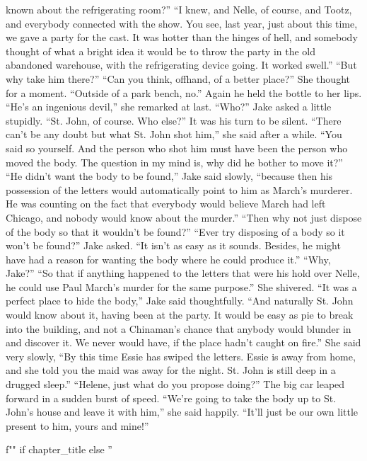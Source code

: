 \documentclass{novel}
\begin{document}
known about the refrigerating room?” “I knew, and Nelle, of course, and Tootz, and everybody connected with the show. You see, last year, just about this time, we gave a party for the cast. It was hotter than the hinges of hell, and somebody thought of what a bright idea it would be to throw the party in the old abandoned warehouse, with the refrigerating device going. It worked swell.” “But why take him there?” “Can you think, offhand, of a better place?” She thought for a moment. “Outside of a park bench, no.” Again he held the bottle to her lips. “He’s an ingenious devil,” she remarked at last. “Who?” Jake asked a little stupidly. “St. John, of course. Who else?” It was his turn to be silent. “There can’t be any doubt but what St. John shot him,” she said after a while. “You said so yourself. And the person who shot him must have been the person who moved the body. The question in my mind is, why did he bother to move it?” “He didn’t want the body to be found,” Jake said slowly, “because then his possession of the letters would automatically point to him as March’s murderer. He was counting on the fact that everybody would believe March had left Chicago, and nobody would know about the murder.” “Then why not just dispose of the body so that it wouldn’t be found?” “Ever try disposing of a body so it won’t be found?” Jake asked. “It isn’t as easy as it sounds. Besides, he might have had a reason for wanting the body where he could produce it.” “Why, Jake?” “So that if anything happened to the letters that were his hold over Nelle, he could use Paul March’s murder for the same purpose.” She shivered. “It was a perfect place to hide the body,” Jake said thoughtfully. “And naturally St. John would know about it, having been at the party. It would be easy as pie to break into the building, and not a Chinaman’s chance that anybody would blunder in and discover it. We never would have, if the place hadn’t caught on fire.” She said very slowly, “By this time Essie has swiped the letters. Essie is away from home, and she told you the maid was away for the night. St. John is still deep in a drugged sleep.” “Helene, just what do you propose doing?” The big car leaped forward in a sudden burst of speed. “We’re going to take the body up to St. John’s house and leave it with him,” she said happily. “It’ll just be our own little present to him, yours and mine!”

\begin{ChapterStart}
\vspace{3\nbs}
f"" if chapter_title else ''
\end{ChapterStart}
\end{document}
